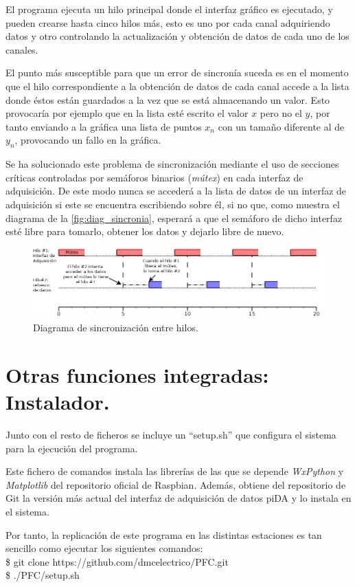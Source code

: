 	El programa ejecuta un hilo principal donde el interfaz gráfico es ejecutado, y pueden crearse hasta cinco hilos más, esto es uno por cada canal adquiriendo datos y otro controlando la actualización y obtención de datos de cada uno de los canales.
	
	El punto más susceptible para que un error de sincronía suceda es en el momento que el hilo correspondiente a la obtención de datos de cada canal accede a la lista donde éstos están guardados a la vez que se está almacenando un valor. Esto provocaría por ejemplo que en la lista esté escrito el valor $ x $ pero no el $ y $, por tanto enviando a la gráfica una lista de puntos $ x_n $ con un tamaño diferente al de $ y_n $, provocando un fallo en la gráfica.
	
	Se ha solucionado este problema de sincronización mediante el uso de secciones críticas controladas por semáforos binarios (\emph{mútex}) en cada interfaz de adquisición. De este modo nunca se accederá a la lista de datos de un interfaz de adquisición si este se encuentra escribiendo sobre él, si no que, como muestra el diagrama de la \autoref{fig:diag_sincronia}, esperará a que el semáforo de dicho interfaz esté libre para tomarlo, obtener los datos y dejarlo libre de nuevo.
	
	\begin{figure}[H]
			\centering
		  	\includegraphics[width=1\textwidth]{img/diag-sincronia.png}
  			\caption{Diagrama de sincronización entre hilos.}\label{fig:diag_sincronia}
		\end{figure}
	
	
\section{Otras funciones integradas: Instalador.}
	Junto con el resto de ficheros se incluye un ``setup.sh'' que configura el sistema para la ejecución del programa. 
	
	Este fichero de comandos instala las librerías de las que se depende \emph{WxPython} y \emph{Matplotlib} del repositorio oficial de Raspbian. Además, obtiene del repositorio de Git la versión más actual del interfaz de adquisición de datos piDA y lo instala en el sistema.
	
	Por tanto, la replicación de este programa en las distintas estaciones es tan sencillo como ejecutar los siguientes comandos:\\
	\indent \$ git clone https://github.com/dmcelectrico/PFC.git \\
	\indent \$ ./PFC/setup.sh \\